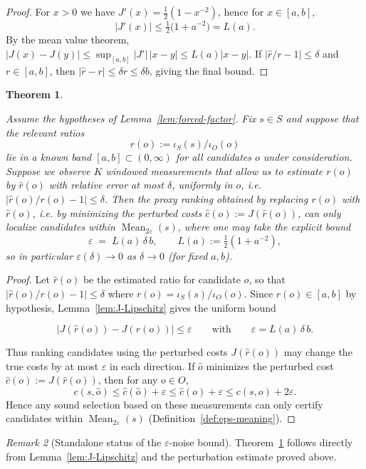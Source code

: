 \documentclass[11pt,reqno]{amsart}
\newtheorem{theorem}{Theorem}[section]
\theoremstyle{definition}
\theoremstyle{remark}
\newtheorem{remark}[theorem]{Remark} %
\newcommand{\1}{\mathbf{1}}
\newcommand{\Mean}{\operatorname{Mean}}
\newcommand{\eps}{\varepsilon}
\begin{document}
\begin{proof}
For $x>0$ we have $J'(x)=\tfrac12(1-x^{-2})$, hence for $x\in[a,b]$,
\[
|J'(x)|\le \tfrac12\bigl(1+a^{-2}\bigr)=L(a).
\]
By the mean value theorem, $|J(x)-J(y)|\le \sup_{[a,b]}|J'|\,|x-y|\le L(a)|x-y|$.
If $|\widehat r/r-1|\le\delta$ and $r\in[a,b]$, then $|\widehat r-r|\le \delta r\le \delta b$, giving the final bound.
\end{proof}
\begin{theorem}\label{thm:eps-cert}

Assume the hypotheses of Lemma~\ref{lem:forced-factor}. Fix $s\in S$ and suppose that the relevant ratios
\[
r(o):=\iota_S(s)/\iota_O(o)
\]
lie in a known band $[a,b]\subset(0,\infty)$ for all candidates $o$ under consideration. Suppose we observe $K$
windowed measurements that allow us to estimate $r(o)$ by $\widehat r(o)$ with relative error at most $\delta$,
uniformly in $o$, i.e.\ $|\widehat r(o)/r(o)-1|\le \delta$. Then the proxy ranking obtained by replacing $r(o)$ with $\widehat r(o)$, i.e. by minimizing the perturbed costs $\widehat c(o):=J(\widehat r(o))$, can only localize candidates within $\Mean_{2\eps}(s)$, where one may take the explicit bound
\[
\eps \;=\; L(a)\,\delta\, b,
\qquad L(a):=\tfrac12(1+a^{-2}),
\]
so in particular $\eps(\delta)\to 0$ as $\delta\to 0$ (for fixed $a,b$).

\end{theorem}

\begin{proof}
Let $\widehat r(o)$ be the estimated ratio for candidate $o$, so that $|\widehat r(o)/r(o)-1|\le \delta$ where
$r(o)=\iota_S(s)/\iota_O(o)$. Since $r(o)\in[a,b]$ by hypothesis, Lemma~\ref{lem:J-Lipschitz} gives the uniform bound

\[
|J(\widehat r(o))-J(r(o))|\le \eps
\qquad\text{with}\qquad
\eps=L(a)\,\delta\,b.
\]

Thus ranking candidates using the perturbed costs $J(\widehat r(o))$ may change the true costs by at most $\eps$ in each direction. If $\widehat o$ minimizes the perturbed cost $\widehat c(o):=J(\widehat r(o))$, then for any $o\in O$,
\[
c(s,\widehat o)\le \widehat c(\widehat o)+\eps\le \widehat c(o)+\eps\le c(s,o)+2\eps.
\]
Hence any sound selection based on these measurements can only certify candidates within $\Mean_{2\eps}(s)$ (Definition~\ref{def:eps-meaning}).
\end{proof}


\begin{remark}[Standalone status of the $\eps$-noise bound]
Theorem~\ref{thm:eps-cert} follows directly from
Lemma~\ref{lem:J-Lipschitz} and the perturbation estimate proved above.
\end{remark}
\end{document}
